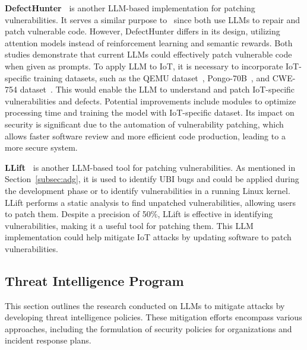 \smallskip
\noindent \textbf{DefectHunter~\citet{wang2023defecthunter}} is another LLM-based implementation for patching vulnerabilities.
It serves a similar purpose to~\citet{islam2024llmpowered} since both use LLMs to repair and patch vulnerable code.
However, DefectHunter differs in its design, utilizing attention models instead of reinforcement learning and semantic rewards.
Both studies demonstrate that current LLMs could effectively patch vulnerable code when given as prompts.
To apply LLM to IoT, it is necessary to incorporate IoT-specific training datasets, such as the QEMU dataset~\citet{zhou2019devign}, Pongo-70B~\citet{Pongo-70B}, and CWE-754 dataset~\citet{NVD}.
This would enable the LLM to understand and patch IoT-specific vulnerabilities and defects.
Potential improvements include modules to optimize processing time and training the model with IoT-specific dataset.
Its impact on security is significant due to the automation of vulnerability patching, which allows faster software review and more efficient code production, leading to a more secure system.
%

%
\smallskip
\noindent \textbf{LLift~\citet{libugdetection2024}} is another LLM-based tool for patching vulnerabilities.
As mentioned in Section~\ref{subsec:adg}, it is used to identify UBI bugs and could be applied during the development phase or to identify vulnerabilities in a running Linux kernel.
LLift performs a static analysis to find unpatched vulnerabilities, allowing users to patch them.
Despite a precision of 50\%, LLift is effective in identifying vulnerabilities, making it a useful tool for patching them.
This LLM implementation could help mitigate IoT attacks by updating software to patch vulnerabilities.
%
\subsection{Threat Intelligence Program}
%
This section outlines the research conducted on LLMs to mitigate attacks by developing threat intelligence policies.
These mitigation efforts encompass various approaches, including the formulation of security policies for organizations and incident response plans.


